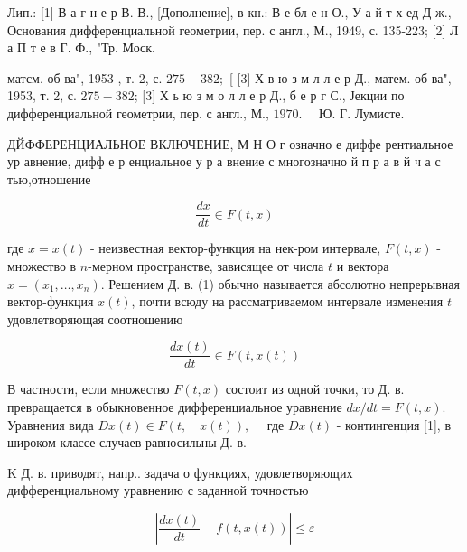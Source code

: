 \documentclass[10pt]{article}
\begin{document}
Лип.: [1] В а г н е р В. В., [Дополнение], в кн.: В е бл е н О., У а й т х ед Д ж., Основания дифференциальной геометрии, пер. с англ., М., 1949, с. 135-223; [2] Л а П т е в Г. Ф., "Тр. Моск.

матсм. об-ва", 1953 , т. 2, с. $275-382 ;$ [ [3] Х в ю з м л л е р Д., матем. об-ва", 1953, т. 2, с. $275-382$; [3] Х ь ю з м о л л е р Д., б е р г С., Јекции по дифференциальной геометрии, пер. с англ., М., $1970 . \quad$ Ю. Г. Лумисте.



ДЙФФЕРЕНЦИАЛЬНОЕ ВКЛЮЧЕНИЕ, М Н О г означно е диффе рентиальное ур авнение, дифф е р енциальное у р а внение с многозначно й п р а в й ч а с тью,отношение



\[

\frac{d x}{d t} \in F(t, x)

\]



где $x=x(t)$ - неизвестная вектор-функция на нек-ром интервале, $F(t, x)$ - множество в $n$-мерном пространстве, зависящее от числа $t$ и вектора $x=\left(x_{1}, \ldots, x_{n}\right)$. Решением Д. в. (1) обычно называется абсолютно непрерывная вектор-функция $x(t)$, почти всюду на рассматриваемом интервале изменения $t$ удовлетворяющая соотношению



\[

\frac{d x(t)}{d t} \in F(t, x(t))

\]



В частности, если множество $F(t, x)$ состоит из одной точки, то Д. в. превращается в обыкновенное дифференциальное уравнение $d x / d t=F(t, x)$. Уравнения вида $D x(t) \in F(t, \quad x(t)), \quad$ где $D x(t)$ - контингенция [1], в широком классе случаев равносильны Д. в.



K Д. в. приводят, напр.. задача о функциях, удовлетворяющих дифференциальному уравнению с заданной точностью



\[

\left|\frac{d x(t)}{d t}-f(t, x(t))\right| \leqslant \varepsilon

\]
\end{document}
